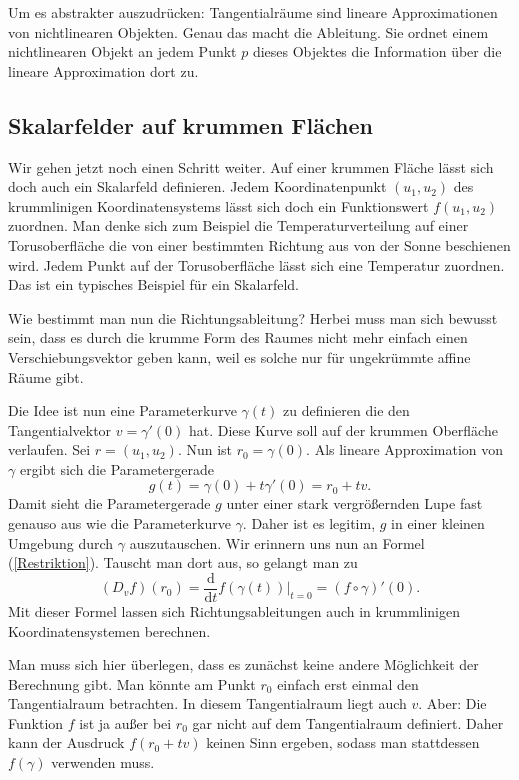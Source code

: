 \documentclass[a4paper,12pt,fleqn]{article}
\begin{document}
Um es abstrakter auszudrücken: Tangentialräume sind lineare
Approximationen von nichtlinearen Objekten. Genau das macht
die Ableitung. Sie ordnet einem nichtlinearen Objekt an jedem
Punkt \(p\) dieses Objektes die Information über die lineare
Approximation dort zu.

\subsection{Skalarfelder auf krummen Flächen}

Wir gehen jetzt noch einen Schritt weiter.
Auf einer krummen Fläche lässt sich doch auch ein
Skalarfeld definieren. Jedem Koordinatenpunkt \((u_1,u_2)\)
des krummlinigen Koordinatensystems lässt sich doch
ein Funktionswert \(f(u_1,u_2)\) zuordnen. Man denke sich zum Beispiel
die Temperaturverteilung auf einer Torusoberfläche die von einer
bestimmten Richtung aus von der Sonne beschienen wird. Jedem Punkt
auf der Torusoberfläche lässt sich eine Temperatur zuordnen.
Das ist ein typisches Beispiel für ein Skalarfeld.

Wie bestimmt man nun die Richtungsableitung? Herbei muss man sich
bewusst sein, dass es durch die krumme Form des Raumes nicht mehr
einfach einen Verschiebungsvektor geben kann, weil es solche nur für
ungekrümmte affine Räume gibt.

Die Idee ist nun eine Parameterkurve \(\gamma(t)\) zu definieren die den
Tangentialvektor \(v=\gamma'(0)\) hat. Diese Kurve soll auf der
krummen Oberfläche verlaufen. Sei \(r=(u_1,u_2)\). Nun ist
\(r_0=\gamma(0)\). Als lineare Approximation von \(\gamma\) ergibt
sich die Parametergerade
\begin{equation}
g(t) = \gamma(0)+t\gamma'(0) = r_0+tv.
\end{equation}
Damit sieht die Parametergerade \(g\) unter einer stark vergrößernden
Lupe fast genauso aus wie die Parameterkurve \(\gamma\). Daher
ist es legitim, \(g\) in einer kleinen Umgebung durch \(\gamma\)
auszutauschen. Wir erinnern uns nun an Formel (\ref{Restriktion}).
Tauscht man dort aus, so gelangt man zu
\begin{equation}\label{via-gamma}
(D_v f)(r_0) = \frac{\mathrm d}{\mathrm dt}f(\gamma(t))\Big|_{t=0}
= (f\circ\gamma)'(0).
\end{equation}
Mit dieser Formel lassen sich Richtungsableitungen auch
in krummlinigen Koordinatensystemen berechnen.

Man muss sich hier überlegen, dass es zunächst keine andere Möglichkeit
der Berechnung gibt. Man könnte am Punkt \(r_0\) einfach erst einmal
den Tangentialraum betrachten. In diesem Tangentialraum liegt auch
\(v\). Aber: Die Funktion \(f\) ist ja außer bei \(r_0\)
gar nicht auf dem Tangentialraum definiert. Daher kann der Ausdruck
\(f(r_0+tv)\) keinen Sinn ergeben, sodass man stattdessen
\(f(\gamma)\) verwenden muss.
\end{document}
